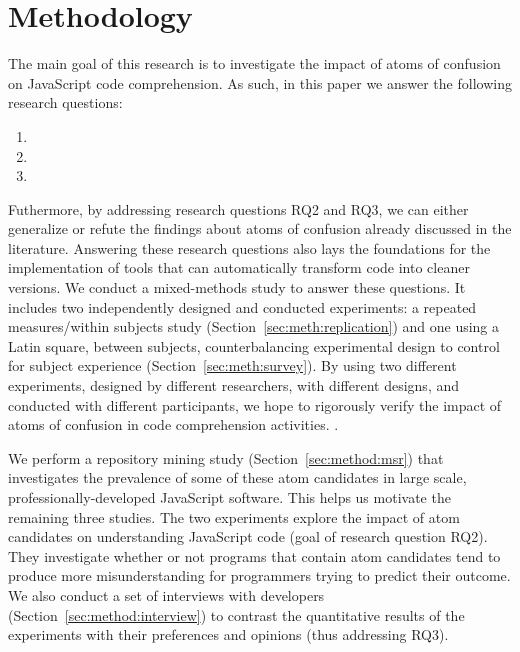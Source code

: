 \section{Methodology}
\label{method}

The main goal of this research is to investigate the impact of atoms of confusion on JavaScript code comprehension. As such, in this paper we answer the following research questions: 

\begin{enumerate}[(RQ1)]
\item \rqd
\item \rqa 
\item \rqb 
\end{enumerate}

Futhermore, by addressing research questions RQ2 and RQ3, we can either generalize or refute the findings about atoms of confusion already discussed in the literature. 
Answering these research questions also lays the foundations for the implementation of tools that can automatically transform code into cleaner versions.
We conduct a mixed-methods study to answer these questions. 
It includes two independently designed and conducted experiments: a repeated measures/within subjects study (Section~\ref{sec:meth:replication}) and one using a Latin square, between subjects, counterbalancing experimental design to control for subject experience (Section~\ref{sec:meth:survey}). By using two different experiments, designed by different researchers, with different designs, and conducted with different participants, we hope to rigorously verify the impact of atoms of confusion in code comprehension activities. .

We perform a repository mining study (Section~\ref{sec:method:msr}) that investigates the prevalence of some of these atom candidates in large scale, professionally-developed JavaScript software. This helps us motivate the remaining three studies.
The two experiments explore the impact of atom candidates on understanding JavaScript code (goal of research question RQ2). They investigate whether or not programs that contain atom candidates tend to produce more misunderstanding for programmers trying to predict their outcome.%
We also conduct a set of interviews with developers (Section~\ref{sec:method:interview}) to contrast the quantitative results of the experiments with their preferences and opinions (thus addressing RQ3). 
